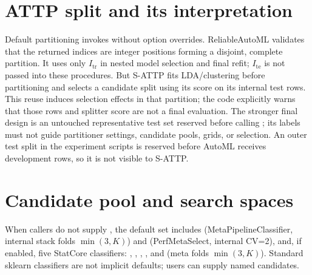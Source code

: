 ﻿\documentclass[conference]{IEEEtran}
\begin{document}
\section{ATTP split and its interpretation}
Default partitioning invokes  without option overrides. ReliableAutoML validates that the returned indices are integer positions forming a disjoint, complete partition. It uses only \(I_{\mathrm{tr}}\) in nested model selection and final refit; \(I_{\mathrm{te}}\) is not passed into these procedures. But S-ATTP fits LDA/clustering before partitioning and selects a candidate split using its score on its internal test rows. This reuse induces selection effects in that partition; the code explicitly warns that those rows and splitter score are not a final evaluation. The stronger final design is an untouched representative test set reserved before calling ; its labels must not guide partitioner settings, candidate pools, grids, or selection. An outer test split in the experiment scripts is reserved before AutoML receives development rows, so it is not visible to S-ATTP.

\section{Candidate pool and search spaces}
When callers do not supply , the default set includes  (MetaPipelineClassifier, internal stack folds \(\min(3,K)\)) and  (PerfMetaSelect, internal CV=2), and, if enabled, five StatCore classifiers: , , , , and  (meta folds \(\min(3,K)\)). Standard sklearn classifiers are not implicit defaults; users can supply named candidates.
\end{document}
